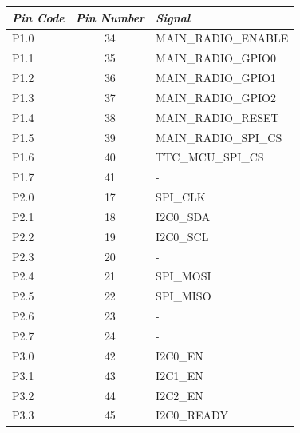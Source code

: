 \begin{table}[!h]
    \centering
    \begin{tabular}{lcl}
        \toprule[1.5pt]
        \textit{Pin Code} & \textit{Pin Number} & \textit{Signal}       \\
        \midrule
        P1.0              & 34                  & MAIN\_RADIO\_ENABLE   \\
        P1.1              & 35                  & MAIN\_RADIO\_GPIO0    \\
        P1.2              & 36                  & MAIN\_RADIO\_GPIO1    \\
        P1.3              & 37                  & MAIN\_RADIO\_GPIO2    \\
        P1.4              & 38                  & MAIN\_RADIO\_RESET    \\
        P1.5              & 39                  & MAIN\_RADIO\_SPI\_CS  \\
        P1.6              & 40                  & TTC\_MCU\_SPI\_CS     \\
        P1.7              & 41                  & -                     \\
        \midrule
        P2.0              & 17                  & SPI\_CLK              \\
        P2.1              & 18                  & I2C0\_SDA             \\
        P2.2              & 19                  & I2C0\_SCL             \\
        P2.3              & 20                  & -                     \\
        P2.4              & 21                  & SPI\_MOSI             \\
        P2.5              & 22                  & SPI\_MISO             \\
        P2.6              & 23                  & -                     \\
        P2.7              & 24                  & -                     \\
        \midrule
        P3.0              & 42                  & I2C0\_EN              \\
        P3.1              & 43                  & I2C1\_EN              \\
        P3.2              & 44                  & I2C2\_EN              \\
        P3.3              & 45                  & I2C0\_READY           \\

\end{tabular}
\end{table}
